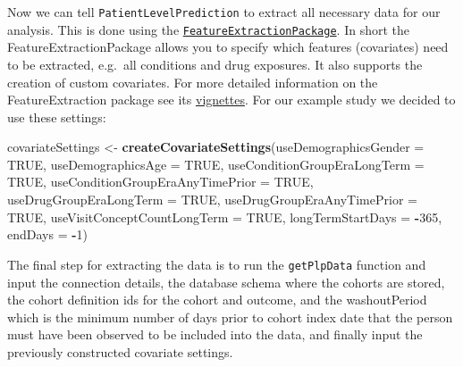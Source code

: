 \documentclass[
]{article}
\newenvironment{Shaded}{\begin{snugshade}}{\end{snugshade}}
\newcommand{\AttributeTok}[1]{\textcolor[rgb]{0.13,0.29,0.53}{#1}}
\newcommand{\ConstantTok}[1]{\textcolor[rgb]{0.56,0.35,0.01}{#1}}
\newcommand{\DecValTok}[1]{\textcolor[rgb]{0.00,0.00,0.81}{#1}}
\newcommand{\FunctionTok}[1]{\textcolor[rgb]{0.13,0.29,0.53}{\textbf{#1}}}
\newcommand{\NormalTok}[1]{#1}
\newcommand{\OtherTok}[1]{\textcolor[rgb]{0.56,0.35,0.01}{#1}}
\newcommand{\SpecialCharTok}[1]{\textcolor[rgb]{0.81,0.36,0.00}{\textbf{#1}}}
\begin{document}
Now we can tell \texttt{PatientLevelPrediction} to extract all necessary
data for our analysis. This is done using the
\href{https://github.com/OHDSI/FeatureExtraction}{\texttt{FeatureExtractionPackage}}.
In short the FeatureExtractionPackage allows you to specify which
features (covariates) need to be extracted, e.g.~all conditions and drug
exposures. It also supports the creation of custom covariates. For more
detailed information on the FeatureExtraction package see its
\href{https://github.com/OHDSI/FeatureExtraction}{vignettes}. For our
example study we decided to use these settings:

\begin{Shaded}
\begin{Highlighting}[]
\NormalTok{    covariateSettings }\OtherTok{\textless{}{-}} \FunctionTok{createCovariateSettings}\NormalTok{(}\AttributeTok{useDemographicsGender =} \ConstantTok{TRUE}\NormalTok{,}
                                                 \AttributeTok{useDemographicsAge =} \ConstantTok{TRUE}\NormalTok{,}
                                                 \AttributeTok{useConditionGroupEraLongTerm =} \ConstantTok{TRUE}\NormalTok{,}
                                                 \AttributeTok{useConditionGroupEraAnyTimePrior =} \ConstantTok{TRUE}\NormalTok{,}
                                                 \AttributeTok{useDrugGroupEraLongTerm =} \ConstantTok{TRUE}\NormalTok{,}
                                                 \AttributeTok{useDrugGroupEraAnyTimePrior =} \ConstantTok{TRUE}\NormalTok{,}
                                                 \AttributeTok{useVisitConceptCountLongTerm =} \ConstantTok{TRUE}\NormalTok{,}
                                                 \AttributeTok{longTermStartDays =} \SpecialCharTok{{-}}\DecValTok{365}\NormalTok{,}
                                                 \AttributeTok{endDays =} \SpecialCharTok{{-}}\DecValTok{1}\NormalTok{)}
\end{Highlighting}
\end{Shaded}

The final step for extracting the data is to run the \texttt{getPlpData}
function and input the connection details, the database schema where the
cohorts are stored, the cohort definition ids for the cohort and
outcome, and the washoutPeriod which is the minimum number of days prior
to cohort index date that the person must have been observed to be
included into the data, and finally input the previously constructed
covariate settings.
\end{document}
